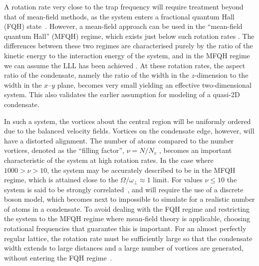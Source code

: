 A rotation rate very close to the trap frequency will require treatment beyond that of mean-field methods, as the system enters a fractional quantum Hall (FQH) state~\cite{Vtx:Regnault_prl_2003}. However, a mean-field approach can be used in the ``mean-field quantum Hall'' (MFQH) regime, which exists just below such rotation rates \cite{BEC:Fetter_revmodphys_2009}. The differences between these two regimes are characterised purely by the ratio of the kinetic energy to the interaction energy of the system, and in the MFQH regime we can assume the LLL has been achieved \cite{Vtx:Zhai_pra_2004,BEC:Stock_laserphyslett_2005}. At these rotation rates, the aspect ratio of the condensate, namely the ratio of the width in the $z$-dimension to the width in the $x$--$y$ plane, becomes very small yielding an effective two-dimensional system. This also validates the earlier assumption for modeling of a quasi-2D condensate.

In such a system, the vortices about the central region will be uniformly ordered due to the balanced velocity fields. Vortices on the condensate edge, however, will have a distorted alignment. The number of atoms compared to the number vortices, denoted as the ``filling factor'', $\nu=N/N_v$ \cite{BK:Ueda_2010,Vtx:Ho_prl_2001}, becomes an important characteristic of the system at high rotation rates. In the case where $1000 > \nu > 10$, the system may be accurately described to be in the MFQH regime, which is attained close to the $\Omega / \omega_{\perp}\approx 1$ limit. For values $\nu \leq 10$ the system is said to be strongly correlated~\cite{BEC:Fetter_revmodphys_2009}, and will require the use of a discrete boson model, which becomes next to impossible to simulate for a realistic number of atoms in a condensate. To avoid dealing with the FQH regime and restricting the system to the MFQH regime where mean-field theory is applicable, choosing rotational frequencies that guarantee this is important. For an almost perfectly regular lattice, the rotation rate must be sufficiently large so that the condensate width extends to large distances and a large number of vortices are generated, without entering the FQH regime~\cite{Vtx:Aftalion_pra_2005}.

